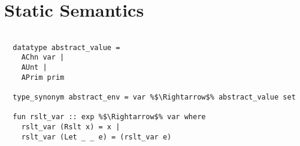 \section{Static Semantics}
\begin{lstlisting}[style=codestyle1, escapechar=\%]

  datatype abstract_value =
    AChn var |
    AUnt |
    APrim prim

  type_synonym abstract_env = var %$\Rightarrow$% abstract_value set

  fun rslt_var :: exp %$\Rightarrow$% var where
    rslt_var (Rslt x) = x |
    rslt_var (Let _ _ e) = (rslt_var e)

  \end{lstlisting}
\begin{lstlisting}[style=codestyle1, escapechar=\%]



\end{lstlisting}
